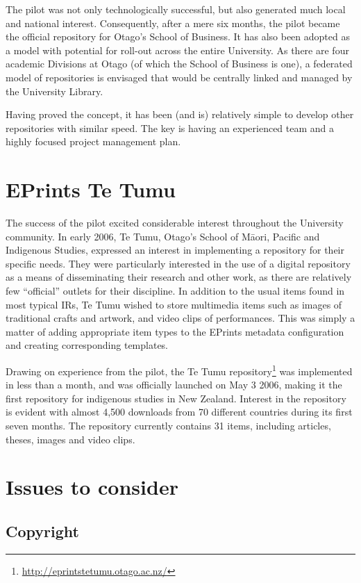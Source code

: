 \documentclass[12pt,pdftex,a4paper,titlepage]{article}
\begin{document}
The pilot was not only technologically successful, but also generated much local and national interest. Consequently, after a mere six months, the pilot became the official repository for Otago's School of Business. It has also been adopted as a model with potential for roll-out across the entire University. As there are four academic Divisions at Otago (of which the School of Business is one), a federated model of repositories is envisaged that would be centrally linked and managed by the University Library.

Having proved the concept, it has been (and is) relatively simple to develop other repositories with similar speed. The key is having an experienced team and a highly focused project management plan. 


\section{EPrints Te Tumu}

The success of the pilot excited considerable interest throughout the University community. In early 2006, Te Tumu, Otago's School of M\={a}ori, Pacific and Indigenous Studies, expressed an interest in implementing a repository for their specific needs. They were particularly interested in the use of a digital repository as a means of disseminating their research and other work, as there are relatively few ``official'' outlets for their discipline. In addition to the usual items found in most typical IRs, Te Tumu wished to store multimedia items such as images of traditional crafts and artwork, and video clips of performances. This was simply a matter of adding appropriate item types to the EPrints metadata configuration and creating corresponding templates.

Drawing on experience from the pilot, the Te Tumu repository\footnote{\url{http://eprintstetumu.otago.ac.nz/}} was implemented in less than a month, and was officially launched on May 3 2006, making it the first repository for indigenous studies in New Zealand. Interest in the repository is evident with almost 4,500 downloads from 70 different countries during its first seven months. The repository currently contains 31 items, including articles, theses, images and video clips.


\section{Issues to consider}


\subsection{Copyright}
\end{document}
